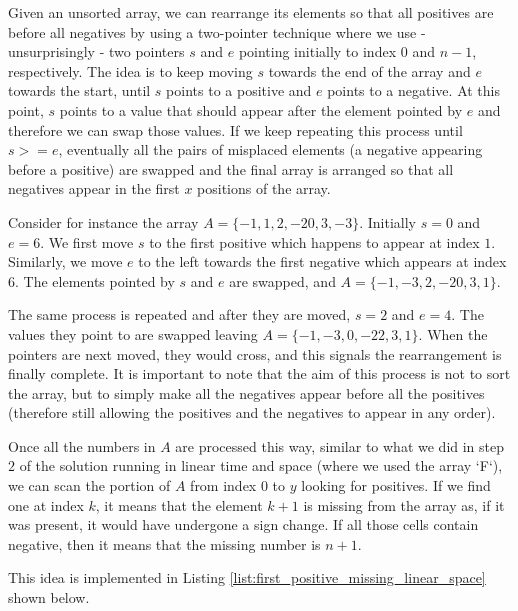 Given an unsorted array, we can rearrange its elements so that all positives are before all negatives by using a two-pointer technique where we use  - unsurprisingly -  two pointers $s$ and $e$ pointing initially to index $0$ and $n-1$, respectively.
The idea is to keep moving $s$ towards the end of the array and $e$ towards the start, until $s$ points to a positive and $e$ points to a negative. At this point, $s$ points to a value that should appear after the element pointed by $e$ and therefore we can swap those values. 
If we keep repeating this process until $s>=e$, eventually all the pairs of misplaced elements (a negative appearing before a positive) are swapped and the final array is arranged so that all negatives appear in the first $x$ positions of the array.

Consider for instance the array $A=\{-1, 1, 2,-2 0,3,-3\}$. Initially $s=0$ and $e=6$. We first move $s$ to the first positive which happens to appear at index $1$. Similarly, we move $e$ to the left towards the first negative which appears at index $6$. The elements pointed by $s$ and $e$ are swapped, and $A=\{-1, -3, 2,-2 0,3,1\}$.

The same process is repeated and after they are moved, $s=2$ and $e=4$. 
The values they point to are swapped leaving $A=\{-1, -3, 0,-2 2,3,1\}$. When the pointers are next moved, they would cross, and this signals the rearrangement is finally complete. It is important to note that the aim of this process is not to sort the array, but to simply make all the negatives appear before all the positives (therefore still allowing the positives and the negatives to appear in any order).


Once all the numbers in $A$ are processed this way, similar to what we did in step $2$ of the solution running in linear time and space (where we used the array `F`), we can scan the portion of $A$ from index $0$ to $y$ looking for positives. 
If we find one at index $k$, it means that the element $k+1$ is missing from the array as, if it was present,  it would have undergone a sign change. 
If all those cells contain negative, then it means that the missing number is $n+1$.

This idea is implemented in Listing \ref{list:first_positive_missing_linear_space} shown below.



